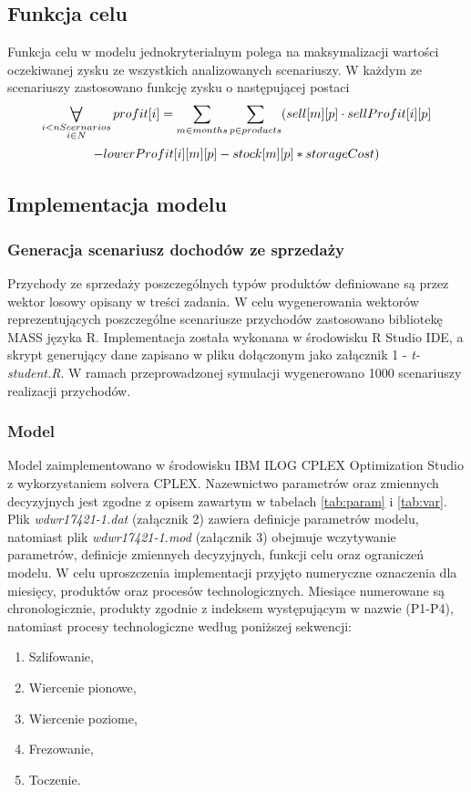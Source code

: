 \documentclass[11pt,a4paper]{article}
\newcommand\bigforall{%
  \mathop{\lower0.75ex\hbox{\ensuremath{%
    \mathlarger{\mathlarger{\mathlarger{\mathlarger{\forall}}}}}}}%
  \limits}
\begin{document}
\subsection{Funkcja celu}
Funkcja celu w modelu jednokryterialnym polega na maksymalizacji wartości oczekiwanej zysku ze wszystkich analizowanych scenariuszy. W każdym ze scenariuszy zastosowano funkcję zysku o następującej postaci
\begin{multline}
\bigforall_{\substack{
			i<nScernarios\\ 
			i \in N}}  
	profit[i] =\sum_{m \in months} \sum_{p \in products}
		(sell[m][p]\cdot sellProfit[i][p] \\ -lowerProfit[i][m][p]-stock[m][p]*storageCost)
\end{multline}
 


\subsection{Implementacja modelu}
\subsubsection{Generacja scenariusz dochodów ze sprzedaży}
Przychody ze sprzedaży poszczególnych typów produktów definiowane są przez wektor losowy opisany w treści zadania. W celu wygenerowania wektorów reprezentujących poszczególne scenariusze przychodów zastosowano bibliotekę MASS języka R. Implementacja została wykonana w środowisku R Studio IDE, a skrypt generujący dane zapisano w pliku dołączonym jako załącznik 1 - \textit{t-student.R}. W ramach przeprowadzonej symulacji wygenerowano 1000 scenariuszy realizacji przychodów.

\subsubsection{Model}
Model zaimplementowano w środowisku IBM ILOG CPLEX Optimization Studio z wykorzystaniem solvera CPLEX. Nazewnictwo parametrów oraz zmiennych decyzyjnych jest zgodne z opisem zawartym w tabelach \ref{tab:param} i \ref{tab:var}. Plik \textit{wdwr17421-1.dat} (załącznik 2) zawiera definicje parametrów modelu, natomiast plik \textit{wdwr17421-1.mod} (załącznik 3) obejmuje wczytywanie parametrów, definicje zmiennych decyzyjnych, funkcji celu oraz ograniczeń modelu. W celu uproszczenia implementacji przyjęto numeryczne oznaczenia dla miesięcy, produktów oraz procesów technologicznych. Miesiące numerowane są chronologicznie, produkty zgodnie z indeksem występującym w nazwie (P1-P4), natomiast procesy technologiczne według poniższej sekwencji:
\begin{enumerate}
\item Szlifowanie,
\item Wiercenie pionowe,
\item Wiercenie poziome,
\item Frezowanie,
\item Toczenie.
\end{enumerate}
\end{document}
